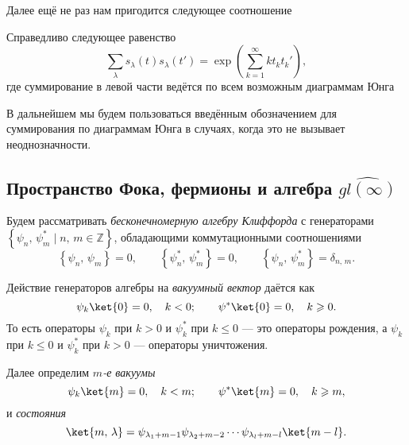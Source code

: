 \documentclass[a4paper,14pt]{extarticle}
\numberwithin{equation}{section}
\begin{document}
Далее ещё не раз нам пригодится следующее соотношение
\begin{stm*}
Справедливо следующее равенство
\[
\sum_{\lambda}^{} s_\lambda(t) s_\lambda(t')=\exp \left( \sum_{k=1}^{\infty} k t_k t_k' \right) 
,\] 
где суммирование в левой части ведётся по всем возможным диаграммам Юнга
\end{stm*}
В дальнейшем мы будем пользоваться введённым обозначением для суммирования
по диаграммам Юнга в случаях, когда это не вызывает неоднозначности.
\subsection{Пространство Фока, фермионы и алгебра $\widehat{gl(\infty)}$}
Будем рассматривать \emph{бесконечномерную алгебру Клиффорда}
с генераторами $\left\{ \psi_n,\,\psi^*_m \mid n,\,m \in \mathbb{Z} \right\} $, обладающими коммутационными соотношениями
\begin{equation}
\left\{ \psi_n,\,\psi_m \right\} =0,\qquad
\left\{ \psi_n^*,\,\psi^*_{m} \right\}=0,\qquad
\left\{ \psi_n,\,\psi_{m}^* \right\}=\delta_{n,\,m}
.\end{equation} 


\begin{dfn*}
Действие генераторов алгебры на \emph{вакуумный вектор}
даётся как
\begin{equation}
\psi_k\ket{0}=0,\quad k< 0;\qquad\psi^* \ket{0}=0,\quad
k\ge  0
.\end{equation} 
То есть операторы $\psi_k$ при $k>0$ и $\psi^*_k$ при
$k\le 0$ --- это операторы рождения, а $\psi_k$ при $k\le 0$ 
и $\psi_k^*$ при  $k> 0$ --- операторы уничтожения.

Далее определим 
\emph{$m$-е вакуумы}
\begin{equation}
\psi_k\ket{m}=0,\quad k< m;\qquad\psi^* \ket{m}=0,\quad
k\ge  m
,\end{equation}
и 
\emph{состояния}
\begin{equation}
	\ket{m,\,\lambda}= \psi_{\lambda_1+m-1}\psi_{\lambda_2+m-2}\cdots\psi_{\lambda_{l}+m-l}\ket{m-l}
	\label{eq:2281}
.\end{equation} 

\end{dfn*}
\end{document}
